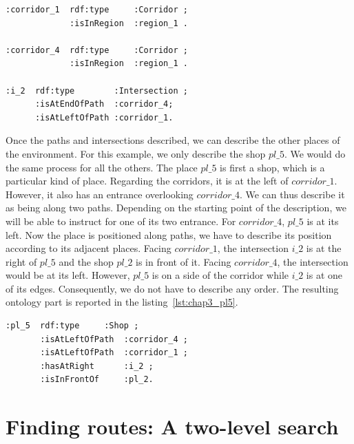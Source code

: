 \begin{lstlisting}[frame=single, basicstyle=\scriptsize\ttfamily, label={lst:chap3_corridors}, caption={Description of the two corridor and their common intersection in the OWL language using the Turle syntax.},captionpos=b, style=OwlTurtle_indiv]
:corridor_1  rdf:type     :Corridor ;
             :isInRegion  :region_1 .
             
:corridor_4  rdf:type     :Corridor ;
             :isInRegion  :region_1 .
             
:i_2  rdf:type        :Intersection ;
      :isAtEndOfPath  :corridor_4;
      :isAtLeftOfPath :corridor_1.
\end{lstlisting}

Once the paths and intersections described, we can describe the other places of the environment. For this example, we only describe the shop $pl\_5$. We would do the same process for all the others. The place $pl\_5$ is first a shop,  which is a particular kind of place. Regarding the corridors, it is at the left of $corridor\_1$. However, it also has an entrance overlooking $corridor\_4$. We can thus describe it as being along two paths. Depending on the starting point of the description, we will be able to instruct for one of its two entrance. For $corridor\_4$, $pl\_5$ is at its left. Now the place is positioned along paths, we have to describe its position according to its adjacent places. Facing $corridor\_1$, the intersection $i\_2$ is at the right of $pl\_5$ and the shop $pl\_2$ is in front of it. Facing $corridor\_4$, the intersection would be at its left. However, $pl\_5$ is on a side of the corridor while $i\_2$ is at one of its edges. Consequently, we do not have to describe any order. The resulting ontology part is reported in the listing~\ref{lst:chap3_pl5}.

\begin{lstlisting}[frame=single, basicstyle=\scriptsize\ttfamily, label={lst:chap3_pl5}, caption={Description of the shop pl\_5 using the SSR in the OWL language using the Turle syntax.},captionpos=b, style=OwlTurtle_indiv]
:pl_5  rdf:type     :Shop ;
       :isAtLeftOfPath  :corridor_4 ;
       :isAtLeftOfPath  :corridor_1 ;
       :hasAtRight      :i_2 ;
       :isInFrontOf     :pl_2.
\end{lstlisting}

\section{Finding routes: A two-level search}

